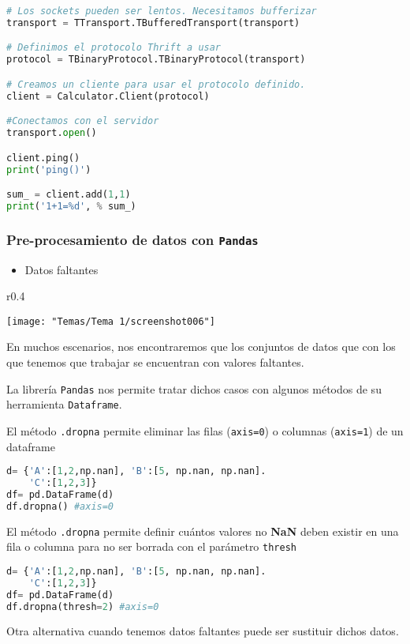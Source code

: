 \begin{enumerate}[label=\color{lightblue}\arabic*)]
\begin{lstlisting}[language=python]
# Los sockets pueden ser lentos. Necesitamos bufferizar
transport = TTransport.TBufferedTransport(transport)

# Definimos el protocolo Thrift a usar
protocol = TBinaryProtocol.TBinaryProtocol(transport)

# Creamos un cliente para usar el protocolo definido.
client = Calculator.Client(protocol)

#Conectamos con el servidor
transport.open()

client.ping()
print('ping()')

sum_ = client.add(1,1)
print('1+1=%d', % sum_)
\end{lstlisting}
\end{enumerate}
\subsubsection{Pre-procesamiento de datos con \texttt{\textbf{Pandas}}}
\begin{itemize}[label=\color{red}\textbullet, leftmargin=*]
	\item \color{lightblue}Datos faltantes
\end{itemize}
\begin{wrapfigure}[9]{r}{0.4\textwidth}
	\begin{center}
		\texttt{[image: "Temas/Tema 1/screenshot006"]}
	\end{center}
\end{wrapfigure}

En muchos escenarios, nos encontraremos que los conjuntos de datos que con los que tenemos que trabajar se encuentran con valores faltantes.

La librería \texttt{Pandas} nos permite tratar dichos casos con algunos métodos de su herramienta \texttt{Dataframe}.

El método \texttt{.dropna} permite eliminar las filas (\texttt{axis=0}) o columnas (\texttt{axis=1}) de un dataframe
\begin{lstlisting}[language=python]
d= {'A':[1,2,np.nan], 'B':[5, np.nan, np.nan].
	'C':[1,2,3]}
df= pd.DataFrame(d)
df.dropna() #axis=0
\end{lstlisting}
El método \texttt{.dropna} permite definir cuántos valores no \textbf{NaN} deben existir en una fila o columna para no ser borrada con el parámetro \texttt{thresh}
\begin{lstlisting}[language=python]
d= {'A':[1,2,np.nan], 'B':[5, np.nan, np.nan].
	'C':[1,2,3]}
df= pd.DataFrame(d)
df.dropna(thresh=2) #axis=0
\end{lstlisting}
Otra alternativa cuando tenemos datos faltantes puede ser sustituir dichos datos.

